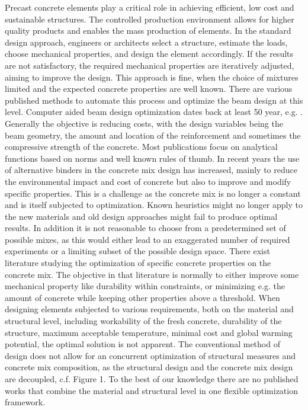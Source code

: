 Precast concrete elements play a critical role in achieving efficient, low cost and sustainable structures.
The controlled production environment allows for higher quality products and enables the mass production of elements.
In the standard design approach, engineers or architects select a structure, estimate the loads, choose mechanical properties, and design the element accordingly. 
If the results are not satisfactory, the required mechanical properties are iteratively adjusted, aiming to improve the design.
This approach is fine, when the choice of mixtures limited and the expected concrete properties are well known.
There are various published methods to automate this process and optimize the beam design at this level.
Computer aided beam design optimization dates back  at least 50 year, e.g. \cite{Haung1967}.
Generally the objective is reducing costs, with the design variables being the beam geometry, the amount and location of the reinforcement and sometimes the compressive strength of the concrete.
Most publications focus on analytical functions based on norms and well known rules of thumb.
In recent years the use of alternative binders in the concrete mix design has increased, mainly to reduce the environmental impact and cost of concrete but also to improve and modify specific properties.
This is a challenge as the concrete mix is no longer a constant and is itself subjected to optimization.
Known heuristics might no longer apply to the new materials and old design approaches might fail to produce optimal results.
In addition it is not reasonable to choose from a predetermined set of possible mixes, as this would either lead to an exaggerated number of required experiments or a limiting subset of the possible design space.
There exist literature studying the optimization of specific concrete properties on the concrete mix.
The objective in that literature is normally to either improve some mechanical property like durability within constraints, or minimizing e.g. the amount of concrete while keeping other properties above a threshold.
When designing elements subjected to various requirements, both on the material and structural level, including workability of the fresh concrete, durability of the structure, maximum acceptable temperature, minimal cost and global warming potential, the optimal solution is not apparent.
The conventional method of design does not allow for an concurrent optimization of structural measures and concrete mix composition, as the structural  design and the concrete mix design are decoupled, c.f. Figure 1.
To the best of our knowledge there are no published works that combine the material and structural level in one flexible optimization framework.

